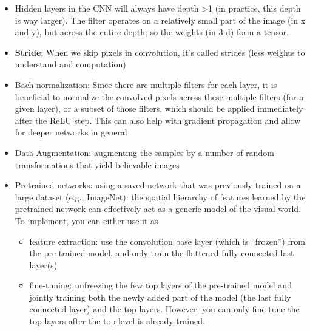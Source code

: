 \documentclass[
]{book}
\providecommand{\tightlist}{%
  \setlength{\itemsep}{0pt}\setlength{\parskip}{0pt}}
\begin{document}
\begin{itemize}
  \begin{itemize}
  \tightlist
  \item
    Example: in color images in RGB format, there are three values that define the pixel color. Then, CNNs consider a tensor convolution where the kernel averaging is over \textbf{location and the variables} (or, ``channels'' such as red, green, blue color value). Each layer of a CNN has ``height, width, and depth'' (i.e., 3-d). For black and white images, each pixel has one value, so the ``depth'' is 1.
  \end{itemize}
\item
  Hidden layers in the CNN will always have depth \textgreater1 (in practice, this depth is way larger). The filter operates on a relatively small part of the image (in x and y), but across the entire depth; so the weights (in 3-d) form a tensor.
\item
  \textbf{Stride}: When we skip pixels in convolution, it's called strides (less weights to understand and computation)
\item
  Bach normalization: Since there are multiple filters for each layer, it is beneficial to normalize the convolved pixels across these multiple filters (for a given layer), or a subset of those filters, which should be applied immediately after the ReLU step. This can also help with gradient propagation and allow for deeper networks in general
\item
  Data Augmentation: augmenting the samples by a number of random transformations that yield believable images
\item
  Pretrained networks: using a saved network that was previously trained on a large dataset (e.g., ImageNet): the spatial hierarchy of features learned by the pretrained network can effectively act as a generic model of the visual world. To implement, you can either use it as

  \begin{itemize}
  \item
    feature extraction: use the convolution base layer (which is ``frozen'') from the pre-trained model, and only train the flattened fully connected last layer(s)
  \item
    fine-tuning: unfreezing the few top layers of the pre-trained model and jointly training both the newly added part of the model (the last fully connected layer) and the top layers. However, you can only fine-tune the top layers after the top level is already trained.
  \end{itemize}
\end{itemize}
\end{document}
